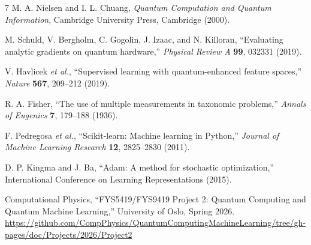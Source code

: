\documentclass[10pt,a4paper]{article}
\begin{document}
\begin{thebibliography}{7}
M. A. Nielsen and I. L. Chuang, \textit{Quantum Computation and Quantum Information}, Cambridge University Press, Cambridge (2000).

M. Schuld, V. Bergholm, C. Gogolin, J. Izaac, and N. Killoran, ``Evaluating analytic gradients on quantum hardware,'' \textit{Physical Review A} \textbf{99}, 032331 (2019).

V. Havlicek \textit{et al.}, ``Supervised learning with quantum-enhanced feature spaces,'' \textit{Nature} \textbf{567}, 209--212 (2019).

R. A. Fisher, ``The use of multiple measurements in taxonomic problems,'' \textit{Annals of Eugenics} \textbf{7}, 179--188 (1936).

F. Pedregosa \textit{et al.}, ``Scikit-learn: Machine learning in Python,'' \textit{Journal of Machine Learning Research} \textbf{12}, 2825--2830 (2011).

D. P. Kingma and J. Ba, ``Adam: A method for stochastic optimization,'' International Conference on Learning Representations (2015).

Computational Physics, ``FYS5419/FYS9419 Project 2: Quantum Computing and Quantum Machine Learning,'' University of Oslo, Spring 2026. \url{https://github.com/CompPhysics/QuantumComputingMachineLearning/tree/gh-pages/doc/Projects/2026/Project2}
\end{thebibliography}
\end{document}
